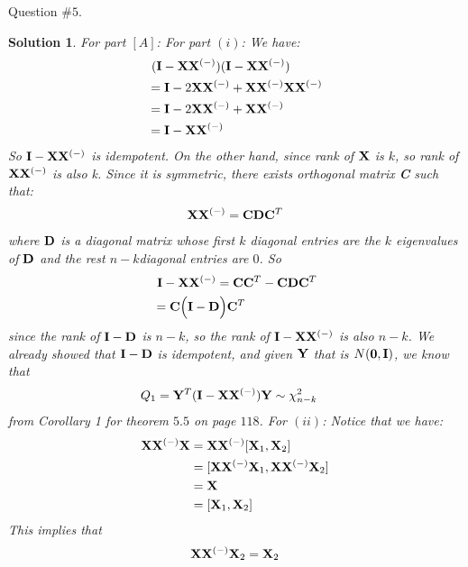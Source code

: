 \documentclass[11pt]{article}
\newtheorem{sol}{Solution}
\begin{document}
Question $\#5$.
\begin{sol}
	For part $[A]$:\vskip 2mm
	For part $(i)$:\vskip 2mm
	We have:
	\begin{align*}
		&\ ({\bf I} - {\bf X}{\bf X}^{(-)})({\bf I} - {\bf X}{\bf X}^{(-)})\\
		&= {\bf I} -  2{\bf X}{\bf X}^{(-)} +  {\bf X}{\bf X}^{(-)} {\bf X}{\bf X}^{(-)}\\
		&= {\bf I} -  2{\bf X}{\bf X}^{(-)}  + {\bf X}{\bf X}^{(-)}\\
		&= {\bf I} -  {\bf X}{\bf X}^{(-)} 
	\end{align*}
	So ${\bf I} - {\bf X}{\bf X}^{(-)}$ is idempotent. \vskip 2mm
	On the other hand, since rank of ${\bf X}$ is $k$, so rank of ${\bf X}{\bf X}^{(-)}$ is also k. Since it is symmetric, there exists orthogonal matrix {\bf C} such that:
	\begin{align*}
		{\bf X}{\bf X}^{(-)} = {\bf C}{\bf D}{\bf C}^T
	\end{align*}
	where ${\bf D}$ is a diagonal matrix whose first $k$ diagonal entries are the $k$ eigenvalues of ${\bf D}$ and the rest $n - k$diagonal entries are $0$.\vskip 2mm
	So 
	\begin{align*}
		&\ {\bf I} - {\bf X}{\bf X}^{(-)} = {\bf C}{\bf C}^T - {\bf C}{\bf D}{\bf C}^T\\
		&= {\bf C}\Big({\bf I} - {\bf D}\Big){\bf C}^T
	\end{align*}
	since the rank of ${\bf I} - {\bf D}$ is $n - k$, so the rank of ${\bf I} - {\bf X}{\bf X}^{(-)}$ is also $n - k$.\vskip 2mm
	We already showed that  ${\bf I} - {\bf D}$ is idempotent, and given ${\bf Y}$ that is $N({\bf 0}, {\bf I})$, we know that 
	\begin{align*}
		Q_1 &= {\bf Y}^T({\bf I} - {\bf X}{\bf X}^{(-)}){\bf Y} \sim \chi^2_{n - k}
	\end{align*}
	from Corollary 1 for theorem $5.5$ on page $118$.\vskip 2mm
	For $(ii)$:\vskip 2mm
	Notice that we have:
	\begin{align*}
		{\bf X}{\bf X}^{(-)}{\bf X} &= {\bf X}{\bf X}^{(-)}[{\bf X}_1, {\bf X}_2]\\
		&= [{\bf X}{\bf X}^{(-)}{\bf X}_1, {\bf X}{\bf X}^{(-)}{\bf X}_2]\\
		&= {\bf X}\\
		&= [{\bf X}_1, {\bf X}_2]
	\end{align*}
	This implies that 
	\begin{align*}
		{\bf X}{\bf X}^{(-)}{\bf X}_2 = {\bf X}_2
	\end{align*}

\end{sol}
\end{document}
